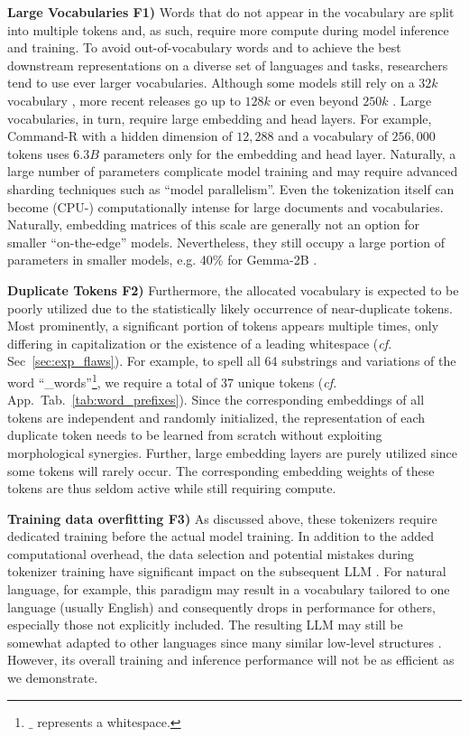 \documentclass[11pt]{article}
\begin{document}
\textbf{Large Vocabularies F1)} Words that do not appear in the vocabulary are split into multiple tokens and, as such, require more compute during model inference and training.
To avoid out-of-vocabulary words and to achieve the best downstream representations on a diverse set of languages and tasks,
researchers tend to use ever larger vocabularies. Although some models still rely on a $32k$ vocabulary \cite{touvron2023llama2, jiang2023mistral}, more recent releases go up to $128k$ \cite{meta2024llama3} or even beyond $250k$ \cite{mesnard2024gemma, cohere2024commandr}. 
Large vocabularies, in turn, require large embedding and head layers. 
For example, Command-R \cite{cohere2024commandr} with a hidden dimension of $12,288$ and a vocabulary of $256,000$ tokens uses $6.3B$ parameters only for the embedding and head layer.
Naturally, a large number of parameters complicate model training and may require 
advanced sharding techniques such as ``model parallelism''.
Even the tokenization itself can become \mbox{(CPU-)} computationally intense for large documents and vocabularies.
Naturally, embedding matrices of this scale are generally not an option for smaller ``on-the-edge'' models. 
Nevertheless, they still occupy a large portion of parameters in smaller models, e.g. 40\% for Gemma-2B \cite{mesnard2024gemma}. 

\textbf{Duplicate Tokens F2)} Furthermore, the allocated vocabulary is expected to be poorly utilized due to the statistically likely occurrence of near-duplicate tokens. 
Most prominently, a significant portion of tokens appears multiple times, only differing in capitalization or the existence of a leading whitespace (\emph{cf.} Sec~\ref{sec:exp_flaws}).
For example, to spell all 64 substrings and variations of the word ``\_words''\footnote{$\_$ represents a whitespace.}, we require a total of 37 unique tokens (\emph{cf.} App.~Tab.~\ref{tab:word_prefixes}). 
Since the corresponding embeddings of all tokens are independent and randomly initialized, the representation of each duplicate token needs to be learned from scratch without exploiting morphological synergies.
Further, large embedding layers are purely utilized since some tokens will rarely occur. The corresponding embedding weights of these tokens are thus seldom active while still requiring compute.

\textbf{Training data overfitting F3)} As discussed above, these tokenizers require dedicated training before the actual model training. In addition to the added computational overhead, the data selection and potential mistakes during tokenizer training have significant impact on the subsequent LLM \cite{ali2024tokenizer}. 
For natural language, for example, this paradigm may result in a vocabulary tailored to one language (usually English) and consequently drops in performance for others, especially those not explicitly included. 
The resulting LLM may still be somewhat adapted to other languages since many similar low-level structures \cite{nikolov2013exploiting}. However, its overall training and inference performance will not be as efficient as we demonstrate.
\end{document}
